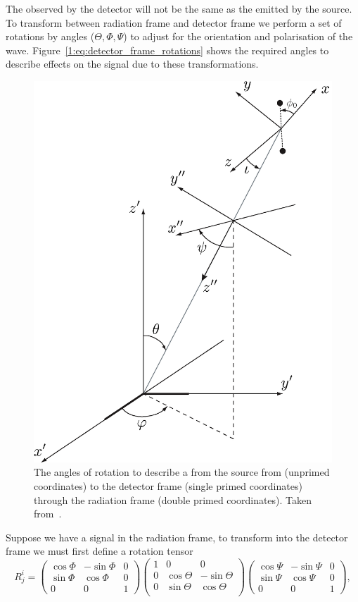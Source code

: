The \gw observed by the detector will not be the same as the \gw emitted by the source. To transform between radiation frame and detector frame we perform a set of rotations by angles ($\Theta, \Phi, \Psi$) to adjust for the orientation and polarisation of the wave. Figure~\ref{1:eq:detector_frame_rotations} shows the required angles to describe effects on the \gwadj signal due to these transformations.
%
\begin{figure}
    \centering
    \includegraphics[width=0.75\linewidth]{images/1_general_relativity/euler.png}
    \caption{The angles of rotation to describe a \gw from the source from (unprimed coordinates) to the detector frame (single primed coordinates) through the radiation frame (double primed coordinates). Taken from~\cite{Brown_Thesis:2004}.}
    \label{1:fig:source_to_detector_frame}
\end{figure}
%
Suppose we have a \gwadj signal in the radiation frame, to transform into the detector frame we must first define a rotation tensor
%
\begin{equation}
    R^{i}_{j} = 
    \begin{pmatrix}
        \cos\Phi & -\sin\Phi & 0 \\
        \sin\Phi &  \cos\Phi & 0 \\
        0        &  0        & 1
    \end{pmatrix}
    \begin{pmatrix}
        1 & 0 & 0 \\
        0 & \cos\Theta & -\sin\Theta \\
        0 & \sin\Theta & \cos\Theta \\
    \end{pmatrix}
    \begin{pmatrix}
        \cos\Psi & -\sin\Psi & 0 \\
        \sin\Psi &  \cos\Psi & 0 \\
        0        &  0        & 1
    \end{pmatrix},
    \label{1:eq:detector_frame_rotations}
\end{equation}
